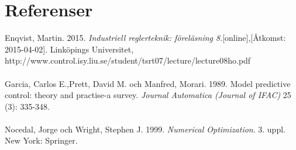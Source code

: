 \section{Referenser}
Enqvist, Martin. 2015. \emph{Industriell reglerteknik: föreläsning 8}.[online],[Åtkomst: 2015-04-02]. Linköpings Universitet, http://www.control.isy.liu.se/student/tsrt07/lecture/lecture08ho.pdf 
\\\\
Garcia, Carlos E.,Prett, David M. och Manfred, Morari. 1989. Model predictive control: theory and practise-a survey. \emph{Journal Automatica (Journal of IFAC)} 25 (3): 335-348. 
\\\\ 
Nocedal, Jorge och Wright, Stephen J. 1999. \emph{Numerical Optimization}. 3. uppl. New York: Springer.